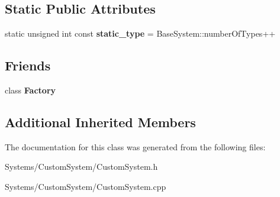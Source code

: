 \subsection*{Static Public Attributes}
\begin{DoxyCompactItemize}
\item 
\mbox{\label{classCustomSystem_a1c3d97bf73201a0c3e1c306440ff94a7}} 
static unsigned int const {\bfseries static\+\_\+type} = Base\+System\+::number\+Of\+Types++
\end{DoxyCompactItemize}
\subsection*{Friends}
\begin{DoxyCompactItemize}
\item 
\mbox{\label{classCustomSystem_a328c093d609680cca505905c6d49901a}} 
class {\bfseries Factory}
\end{DoxyCompactItemize}
\subsection*{Additional Inherited Members}


The documentation for this class was generated from the following files\+:\begin{DoxyCompactItemize}
\item 
Systems/\+Custom\+System/Custom\+System.\+h\item 
Systems/\+Custom\+System/Custom\+System.\+cpp\end{DoxyCompactItemize}
